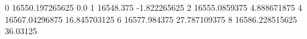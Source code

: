 0 16550.197265625 0.0
1 16548.375 -1.822265625
2 16555.0859375 4.888671875
4 16567.04296875 16.845703125
6 16577.984375 27.787109375
8 16586.228515625 36.03125
